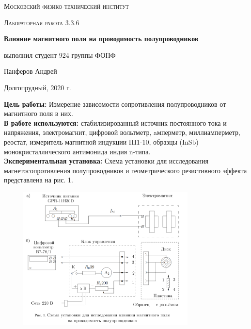 \documentclass[a4paper]{article}
\begin{document}
\begin{titlepage}
	\centering
	\vspace{5cm}
	{\scshape\LARGE Московский физико-технический институт \par}
	\vspace{4cm}
	{\scshape\Large Лабораторная работа 3.3.6 \par}
	\vspace{1cm}
	{\huge\bfseries Влияние магнитного поля на проводимость полупроводников \par}
	\vspace{1cm}
	\vfill
\begin{flushright}
	{\large выполнил студент 924 группы ФОПФ}\par
	\vspace{0.3cm}
	{\LARGE Панферов Андрей}
\end{flushright}
	

	\vfill

	Долгопрудный, 2020 г.
\end{titlepage}

\textbf{Цель работы:} Измерение зависомости сопротивления полупроводников от магнитного поля в них.\\

\textbf{В работе используются:} стабилизированный источник постоянного тока и напряжения, электромагнит, цифровой вольтметр, aмперметр, миллиамперметр, реостат, измеритель магнитной индукции III1-10, образцы (InSb) монокристаллического антимонида индия n-типа.\\

\textbf{Экспериментальная установка:} Схема установки для исследования магнетосопротивления полупроводников и геометрического резистивного эффекта представлена на рис. 1.

\begin{figure}[h]
    \centering
    \includegraphics[width=0.8\textwidth]{scheme.png}
\end{figure}
\end{document}
